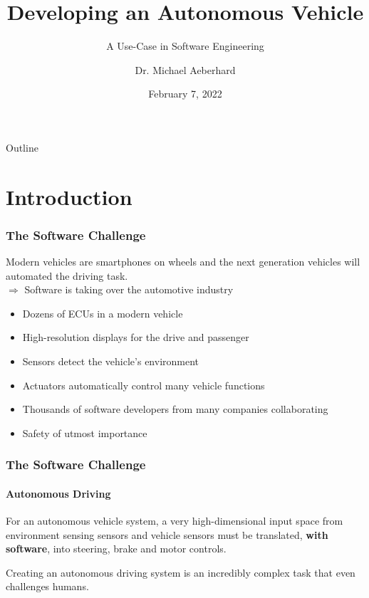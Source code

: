 \documentclass[aspectratio=169]{beamer}
\title{Developing an Autonomous Vehicle}
\subtitle{A Use-Case in Software Engineering}
\author{Dr. Michael Aeberhard}
\date{February 7, 2022}
\begin{document}
\frame{\titlepage}

\begin{frame}{Outline}
    \tableofcontents[hideallsubsections]
\end{frame}


\section{Introduction}





\begin{frame}
\frametitle{The Software Challenge}
Modern vehicles are smartphones on wheels and the next generation vehicles
will automated the driving task.\\
$\Rightarrow$ Software is taking over the automotive industry
\vspace{0.25cm}
\begin{itemize}
    \item Dozens of ECUs in a modern vehicle
    \item High-resolution displays for the drive and passenger
    \item Sensors detect the vehicle's environment
    \item Actuators automatically control many vehicle functions
    \item Thousands of software developers from many companies collaborating
    \item Safety of utmost importance
\end{itemize}
\end{frame}

\begin{frame}
\frametitle{The Software Challenge}
\framesubtitle{Autonomous Driving}
For an autonomous vehicle system, a very high-dimensional input space from
environment sensing sensors and vehicle sensors must be translated,
\textbf{with software}, into steering, brake and motor controls.\\
\begin{block}{}
Creating an autonomous driving system is an incredibly complex task that even
challenges humans.
\end{block}
\end{frame}
\end{document}
